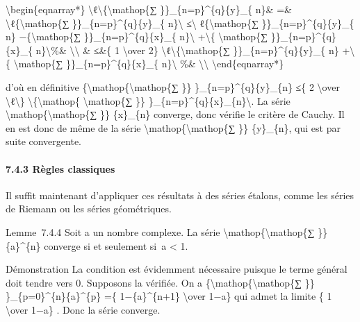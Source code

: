 \documentclass[]{article}
\begin{document}
\textbackslash{}begin\{eqnarray*\}
\textbackslash{}\textbar{}ℓ\textbackslash{}\textbar{}\{\textbackslash{}mathop\{∑
\}\}\_\{n=p\}\^{}\{q\}\{y\}\_\{ n\}\& =\&
\textbackslash{}\textbar{}ℓ\{\textbackslash{}mathop\{∑
\}\}\_\{n=p\}\^{}\{q\}\{y\}\_\{ n\}\textbackslash{}\textbar{}
≤\textbackslash{}\textbar{} ℓ\{\textbackslash{}mathop\{∑
\}\}\_\{n=p\}\^{}\{q\}\{y\}\_\{ n\} −\{\textbackslash{}mathop\{∑
\}\}\_\{n=p\}\^{}\{q\}\{x\}\_\{ n\}\textbackslash{}\textbar{}
+\textbackslash{}\textbar{}\{ \textbackslash{}mathop\{∑
\}\}\_\{n=p\}\^{}\{q\}\{x\}\_\{ n\}\textbackslash{}\textbar{}\%\&
\textbackslash{}\textbackslash{} \& ≤\&\{ 1 \textbackslash{}over 2\}
\textbackslash{}\textbar{}ℓ\textbackslash{}\textbar{}\{\textbackslash{}mathop\{∑
\}\}\_\{n=p\}\^{}\{q\}\{y\}\_\{ n\} +\textbackslash{}\textbar{}\{
\textbackslash{}mathop\{∑ \}\}\_\{n=p\}\^{}\{q\}\{x\}\_\{
n\}\textbackslash{}\textbar{} \%\& \textbackslash{}\textbackslash{}
\textbackslash{}end\{eqnarray*\}

d'où en définitive \{\textbackslash{}mathop\{\textbackslash{}mathop\{∑
\}\} \}\_\{n=p\}\^{}\{q\}\{y\}\_\{n\} ≤\{ 2 \textbackslash{}over
\textbackslash{}\textbar{}ℓ\textbackslash{}\textbar{}\}
\textbackslash{}\textbar{}\{\textbackslash{}mathop\{
\textbackslash{}mathop\{∑ \}\}
\}\_\{n=p\}\^{}\{q\}\{x\}\_\{n\}\textbackslash{}\textbar{}. La série
\textbackslash{}mathop\{\textbackslash{}mathop\{∑ \}\} \{x\}\_\{n\}
converge, donc vérifie le critère de Cauchy. Il en est donc de même de
la série \textbackslash{}mathop\{\textbackslash{}mathop\{∑ \}\}
\{y\}\_\{n\}, qui est par suite convergente.

\paragraph{7.4.3 Règles classiques}

Il suffit maintenant d'appliquer ces résultats à des séries étalons,
comme les séries de Riemann ou les séries géométriques.

Lemme~7.4.4 Soit a un nombre complexe. La série
\textbackslash{}mathop\{\textbackslash{}mathop\{∑ \}\} \{a\}\^{}\{n\}
converge si et seulement si~\textbar{}a\textbar{} \textless{} 1.

Démonstration La condition est évidemment nécessaire puisque le terme
général doit tendre vers 0. Supposons la vérifiée. On a
\{\textbackslash{}mathop\{\textbackslash{}mathop\{∑ \}\}
\}\_\{p=0\}\^{}\{n\}\{a\}\^{}\{p\} =\{ 1−\{a\}\^{}\{n+1\}
\textbackslash{}over 1−a\} qui admet la limite \{ 1 \textbackslash{}over
1−a\} . Donc la série converge.
\end{document}
